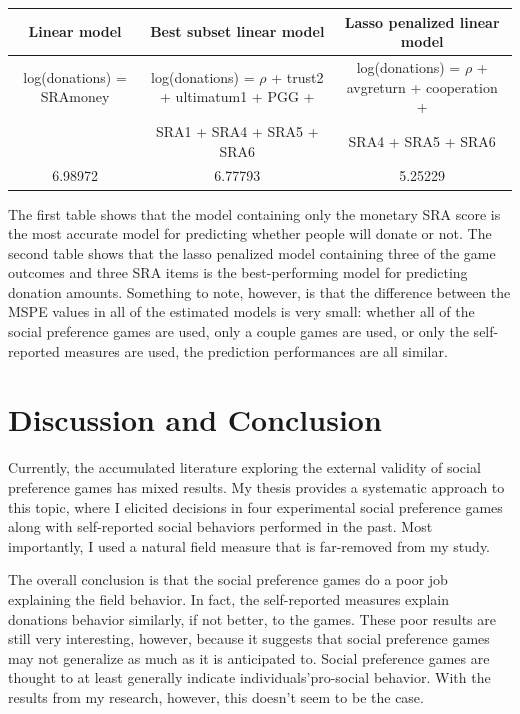 \documentclass[12pt]{article}
\begin{document}
 
 
\begin{center}
\begin{adjustbox}{width=\textwidth}
\begin{tabular}{ c | c | c }
\hline \hline
Linear model & Best subset linear model & Lasso penalized linear model \\
\hline
log(donations) = SRAmoney & log(donations) = \(\rho\) + trust2 + ultimatum1 + PGG + & log(donations) = \(\rho\) + avgreturn + cooperation + \\
\small & SRA1 + SRA4 + SRA5 + SRA6 & SRA4 + SRA5 + SRA6 \\
\hline
6.98972 & 6.77793 & 5.25229 \\
\hline \hline
\end{tabular}
\end{adjustbox}
\end{center}

The first table shows that the model containing only the monetary SRA score is the most accurate model for predicting whether people will donate or not. The second table shows that the lasso penalized model containing three of the game outcomes and three SRA items is the best-performing model for predicting donation amounts. Something to note, however, is that the difference between the MSPE values in all of the estimated models is very small: whether all of the social preference games are used, only a couple games are used, or only the self-reported measures are used, the prediction performances are all similar.

\section{Discussion and Conclusion}

Currently, the accumulated literature exploring the external validity of social preference games has mixed results. My thesis provides a systematic approach to this topic, where I elicited decisions in four experimental social preference games along with self-reported social behaviors performed in the past. Most importantly, I used a natural field measure that is far-removed from my study.

The overall conclusion is that the social preference games do a poor job explaining the field behavior. In fact, the self-reported measures explain donations behavior similarly, if not better, to the games. These poor results are still very interesting, however, because it suggests that social preference games may not generalize as much as it is anticipated to. Social preference games are thought to at least generally indicate individuals\rq pro-social behavior. With the results from my research, however, this doesn\rq t seem to be the case. 
\end{document}
